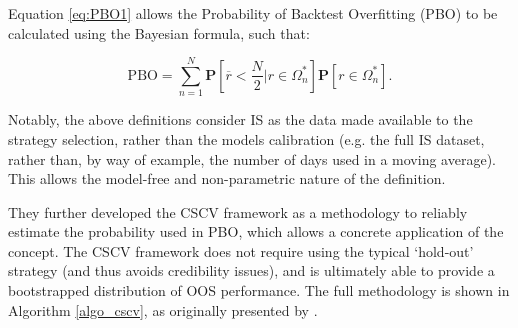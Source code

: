 \documentclass[a4paper,11pt,oneside]{article}
\theoremstyle{plain}
\theoremstyle{definition}
\begin{document}
	Equation \ref{eq:PBO1} allows the Probability of Backtest Overfitting (PBO) to be calculated using the Bayesian formula, such that:
	
	\begin{equation}\label{eq:PBO2}
	\mathrm{PBO} = \sum_{n=1}^{N}\mathbf{P}[\overline{r} < {\frac{N}{2}}|r\in\Omega_{n}^{*}]\mathbf{P}[r\in\Omega_{n}^{*}] .
	\end{equation}
	
	Notably, the above definitions consider IS as the data made available to the strategy selection, rather than the 
	models calibration (e.g. the full IS dataset, rather than, by way of example, the number of days used in a moving average). 
	This allows the model-free and non-parametric nature of the definition. 
	\hfill \break 
	
	They further developed the CSCV framework as a methodology to reliably estimate the probability used in PBO, which allows a concrete application of the concept. The CSCV framework does not require using the typical ‘hold-out’ strategy (and thus avoids credibility issues), and is ultimately able to provide a bootstrapped distribution of OOS performance. The full methodology is shown in Algorithm \ref{algo_cscv}, as originally presented by \citet{BailyPBO}.
	\hfill \break 
	
\end{document}
